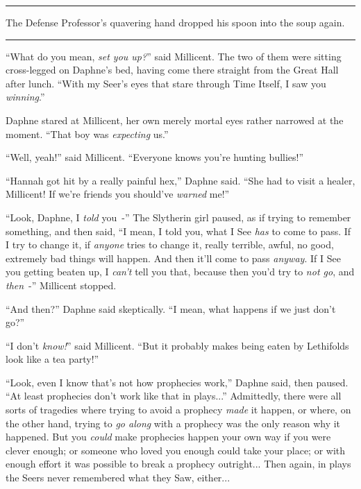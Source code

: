 \begin{center}\rule{3in}{0.4pt}\end{center}

The Defense Professor's quavering hand dropped his spoon into the soup again.

\begin{center}\rule{3in}{0.4pt}\end{center}

``What do you mean, \emph{set you up?}'' said Millicent. The two of them were sitting cross-legged on Daphne's bed, having come there straight from the Great Hall after lunch. ``With my Seer's eyes that stare through Time Itself, I saw you \emph{winning}.''

Daphne stared at Millicent, her own merely mortal eyes rather narrowed at the moment. ``That boy was \emph{expecting} us.''

``Well, yeah!'' said Millicent. ``Everyone knows you're hunting bullies!''

``Hannah got hit by a really painful hex,'' Daphne said. ``She had to visit a healer, Millicent! If we're friends you should've \emph{warned} me!''

``Look, Daphne, I \emph{told} you~-'' The Slytherin girl paused, as if trying to remember something, and then said, ``I mean, I told you, what I See \emph{has} to come to pass. If I try to change it, if \emph{anyone} tries to change it, really terrible, awful, no good, extremely bad things will happen. And then it'll come to pass \emph{anyway}. If I See you getting beaten up, I \emph{can't} tell you that, because then you'd try to \emph{not go}, and \emph{then}~-'' Millicent stopped.

``And then?'' Daphne said skeptically. ``I mean, what happens if we just don't go?''

``I don't \emph{know!}'' said Millicent. ``But it probably makes being eaten by Lethifolds look like a tea party!''

``Look, even I know that's not how prophecies work,'' Daphne said, then paused. ``At least prophecies don't work like that in plays...'' Admittedly, there were all sorts of tragedies where trying to avoid a prophecy \emph{made} it happen, or where, on the other hand, trying to \emph{go along} with a prophecy was the only reason why it happened. But you \emph{could} make prophecies happen your own way if you were clever enough; or someone who loved you enough could take your place; or with enough effort it was possible to break a prophecy outright... Then again, in plays the Seers never remembered what they Saw, either...

